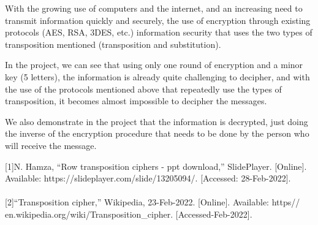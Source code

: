 \documentclass[twoside,twocolumn]{article}
\begin{document}
With the growing use of computers and the internet, and an increasing need to transmit information quickly and securely, the use of encryption through existing protocols (AES, RSA, 3DES, etc.) information security that uses the two types of transposition mentioned (transposition and substitution).

In the project, we can see that using only one round of encryption and a minor key (5 letters), the information is already quite challenging to decipher, and with the use of the protocols mentioned above that repeatedly use the types of transposition, it becomes almost impossible to decipher the messages.

We also demonstrate in the project that the information is decrypted, just doing the inverse of the encryption procedure that needs to be done by the person who will receive the message. \\ 

\vspace*{5.5cm}
\begin{thebibliography}{} %

\footnotesize[1]N. Hamza, “Row transposition ciphers - ppt download,” SlidePlayer. [Online]. Available: https://slideplayer.com/slide/13205094/. [Accessed: 28-Feb-2022].  \\ \\

\footnotesize[2]“Transposition cipher,” Wikipedia, 23-Feb-2022. [Online]. Available: https\:// en.wikipedia.org/wiki/Transposition\_cipher. [Accessed-Feb-2022]. \\ \\


 
\end{thebibliography}


\end{document}
